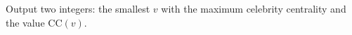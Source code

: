 

  Output two integers: the smallest $v$ with the maximum celebrity centrality and the value $\mathrm{CC}(v)$.

